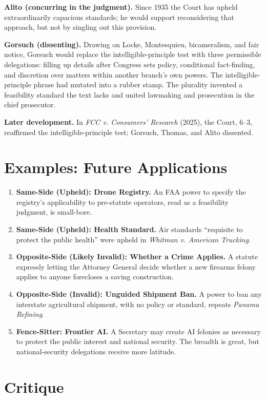 \documentclass[12pt]{article}
\begin{document}
\textbf{Alito (concurring in the judgment).} Since 1935 the Court has upheld extraordinarily capacious standards; he would support reconsidering that approach, but not by singling out this provision.

\textbf{Gorsuch (dissenting).} Drawing on Locke, Montesquieu, bicameralism, and fair notice, Gorsuch would replace the intelligible-principle test with three permissible delegations: filling up details after Congress sets policy, conditional fact-finding, and discretion over matters within another branch's own powers. The intelligible-principle phrase had mutated into a rubber stamp. The plurality invented a feasibility standard the text lacks and united lawmaking and prosecution in the chief prosecutor.

\textbf{Later development.} In \textit{FCC v. Consumers' Research} (2025), the Court, 6--3, reaffirmed the intelligible-principle test; Gorsuch, Thomas, and Alito dissented.

\section{Examples: Future Applications}

\begin{enumerate}
\item \textbf{Same-Side (Upheld): Drone Registry.} An FAA power to specify the registry's applicability to pre-statute operators, read as a feasibility judgment, is small-bore.
\item \textbf{Same-Side (Upheld): Health Standard.} Air standards ``requisite to protect the public health'' were upheld in \textit{Whitman v. American Trucking}.
\item \textbf{Opposite-Side (Likely Invalid): Whether a Crime Applies.} A statute expressly letting the Attorney General decide whether a new firearms felony applies to anyone forecloses a saving construction.
\item \textbf{Opposite-Side (Invalid): Unguided Shipment Ban.} A power to ban any interstate agricultural shipment, with no policy or standard, repeats \textit{Panama Refining}.
\item \textbf{Fence-Sitter: Frontier AI.} A Secretary may create AI felonies as necessary to protect the public interest and national security. The breadth is great, but national-security delegations receive more latitude.
\end{enumerate}

\section{Critique}
\end{document}
